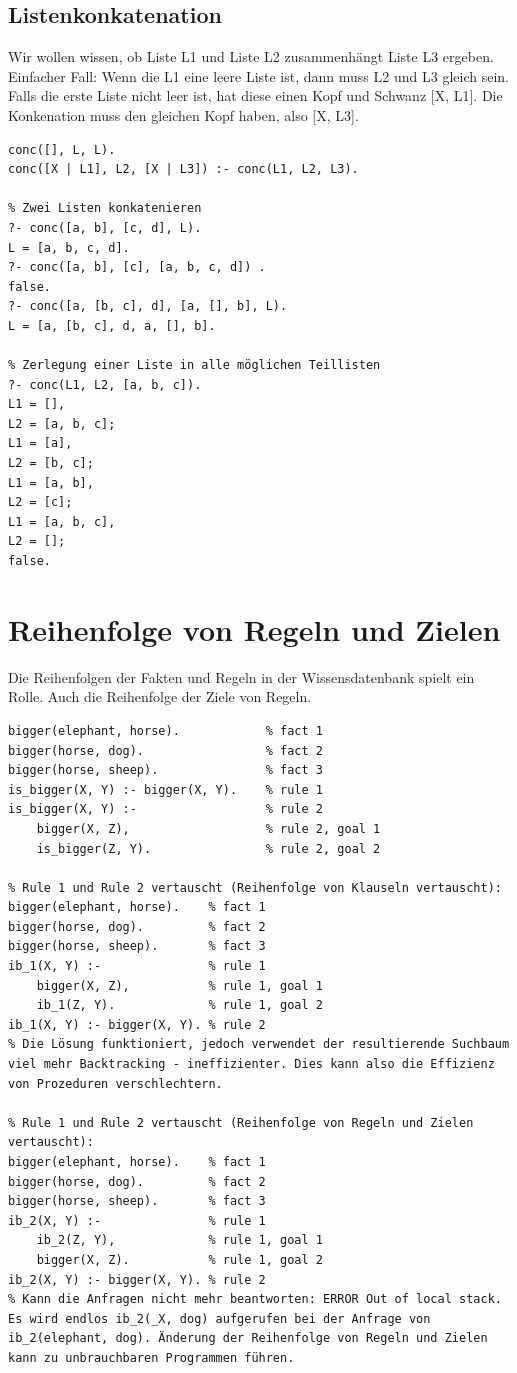 \newpage
\subsection{Listenkonkatenation}
Wir wollen wissen, ob Liste L1 und Liste L2 zusammenhängt Liste L3 ergeben. Einfacher Fall: Wenn die L1 eine leere Liste ist, dann muss L2 und L3 gleich sein. Falls die erste Liste nicht leer ist, hat diese einen Kopf und Schwanz [X, L1]. Die Konkenation muss den gleichen Kopf haben, also [X, L3].

\begin{lstlisting}[caption=Listenkonkatenation]
conc([], L, L).
conc([X | L1], L2, [X | L3]) :- conc(L1, L2, L3).

% Zwei Listen konkatenieren
?- conc([a, b], [c, d], L).
L = [a, b, c, d].
?- conc([a, b], [c], [a, b, c, d]) .
false.
?- conc([a, [b, c], d], [a, [], b], L).
L = [a, [b, c], d, a, [], b].

% Zerlegung einer Liste in alle möglichen Teillisten
?- conc(L1, L2, [a, b, c]).
L1 = [],
L2 = [a, b, c];
L1 = [a],
L2 = [b, c];
L1 = [a, b],
L2 = [c];
L1 = [a, b, c],
L2 = [];
false.
\end{lstlisting}

\newpage
\section{Reihenfolge von Regeln und Zielen}
Die Reihenfolgen der Fakten und Regeln in der Wissensdatenbank spielt ein Rolle. Auch die Reihenfolge der Ziele von Regeln.

\begin{lstlisting}[caption=Reihenfolgen von Regeln und Zielen]
% Bekanntes is_bigger/2 Prädikat:
bigger(elephant, horse). 			% fact 1
bigger(horse, dog). 				% fact 2
bigger(horse, sheep). 				% fact 3
is_bigger(X, Y) :- bigger(X, Y). 	% rule 1
is_bigger(X, Y) :- 					% rule 2
	bigger(X, Z), 					% rule 2, goal 1
	is_bigger(Z, Y). 				% rule 2, goal 2

% Rule 1 und Rule 2 vertauscht (Reihenfolge von Klauseln vertauscht):
bigger(elephant, horse). 	% fact 1
bigger(horse, dog). 		% fact 2
bigger(horse, sheep). 		% fact 3
ib_1(X, Y) :- 				% rule 1
	bigger(X, Z), 			% rule 1, goal 1
	ib_1(Z, Y). 			% rule 1, goal 2
ib_1(X, Y) :- bigger(X, Y). % rule 2
% Die Lösung funktioniert, jedoch verwendet der resultierende Suchbaum viel mehr Backtracking - ineffizienter. Dies kann also die Effizienz von Prozeduren verschlechtern.

% Rule 1 und Rule 2 vertauscht (Reihenfolge von Regeln und Zielen vertauscht):
bigger(elephant, horse). 	% fact 1
bigger(horse, dog). 		% fact 2
bigger(horse, sheep). 		% fact 3
ib_2(X, Y) :- 				% rule 1
	ib_2(Z, Y), 			% rule 1, goal 1
	bigger(X, Z). 			% rule 1, goal 2
ib_2(X, Y) :- bigger(X, Y). % rule 2
% Kann die Anfragen nicht mehr beantworten: ERROR Out of local stack. Es wird endlos ib_2(_X, dog) aufgerufen bei der Anfrage von ib_2(elephant, dog). Änderung der Reihenfolge von Regeln und Zielen kann zu unbrauchbaren Programmen führen.
\end{lstlisting}

